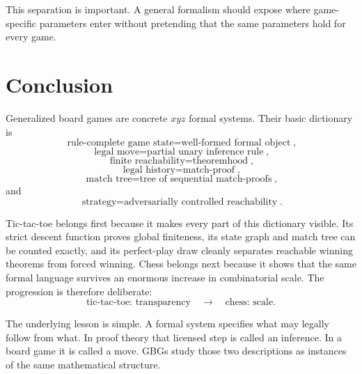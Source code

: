 \documentclass[11pt]{article}
\theoremstyle{definition}
\theoremstyle{remark}
\begin{document}
This separation is important. A general formalism should expose where game-specific parameters enter without pretending that the same parameters hold for every game.

\section{Conclusion}

Generalized board games are concrete $xyz$ formal systems. Their basic dictionary is
\[
\boxed{\text{rule-complete game state}=\text{well-formed formal object}},
\]
\[
\boxed{\text{legal move}=\text{partial unary inference rule}},
\]
\[
\boxed{\text{finite reachability}=\text{theoremhood}},
\]
\[
\boxed{\text{legal history}=\text{match-proof}},
\]
\[
\boxed{\text{match tree}=\text{tree of sequential match-proofs}},
\]
and
\[
\boxed{\text{strategy}=\text{adversarially controlled reachability}}.
\]

Tic-tac-toe belongs first because it makes every part of this dictionary visible. Its strict descent function proves global finiteness, its state graph and match tree can be counted exactly, and its perfect-play draw cleanly separates reachable winning theorems from forced winning. Chess belongs next because it shows that the same formal language survives an enormous increase in combinatorial scale. The progression is therefore deliberate:
\[
\boxed{\text{tic-tac-toe: transparency}\quad\longrightarrow\quad\text{chess: scale}.}
\]

The underlying lesson is simple. A formal system specifies what may legally follow from what. In proof theory that licensed step is called an inference. In a board game it is called a move. GBGs study those two descriptions as instances of the same mathematical structure.
\end{document}
